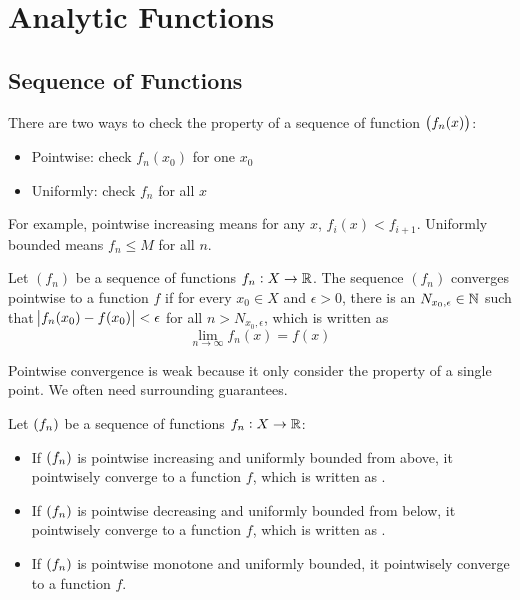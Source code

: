 \chapter{Analytic Functions}



\section{Sequence of Functions}

There are two ways to check the property of a sequence of function $\sequence{f_n (x)}$:
\begin{itemize}
    \item Pointwise: check $f_n (x_0)$ for one $x_0$
    \item Uniformly: check $f_n$ for all $x$
\end{itemize}

For example, pointwise increasing means for any $x$, $f_i (x) < f_{i+1}$. Uniformly bounded means $f_n \leq M$ for all $n$.

\begin{definition}
    Let $(f_n)$ be a sequence of functions $f_n : X \rightarrow \mathbb{R}$. The sequence $(f_n)$ converges pointwise to a function $f$ if for every $x_0 \in X$ and $\epsilon > 0$, there is an $N_{x_0, \epsilon} \in \mathbb{N}$ such that $\abs{f_n (x_0) - f(x_0)} < \epsilon$ for all $n > N_{x_0, \epsilon}$, which is written as
    \begin{equation}
        \lim_{n \rightarrow \infty} f_n (x) = f(x)
    \end{equation}
\end{definition}

Pointwise convergence is weak because it only consider the property of a single point. We often need surrounding guarantees.

\begin{definition}
    Let $\sequence{f_n}$ be a sequence of functions $f_n : X \rightarrow \mathbb{R}$:
    \begin{itemize}
        \item If $\sequence{f_n}$ is pointwise increasing and uniformly bounded from above, it pointwisely converge to a function $f$, which is written as .
        \item If $\sequence{f_n}$ is pointwise decreasing and uniformly bounded from below, it pointwisely converge to a function $f$, which is written as .
        \item If $\sequence{f_n}$ is pointwise monotone and uniformly bounded, it pointwisely converge to a function $f$.
    \end{itemize}
\end{definition}


